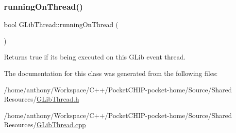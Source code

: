 \subsubsection{\texorpdfstring{running\+On\+Thread()}{runningOnThread()}}
{\footnotesize\ttfamily bool G\+Lib\+Thread\+::running\+On\+Thread (\begin{DoxyParamCaption}{ }\end{DoxyParamCaption})}

Returns true if it\textquotesingle{}s being executed on this G\+Lib event thread. 

The documentation for this class was generated from the following files\+:\begin{DoxyCompactItemize}
\item 
/home/anthony/\+Workspace/\+C++/\+Pocket\+C\+H\+I\+P-\/pocket-\/home/\+Source/\+Shared Resources/\mbox{\hyperlink{GLibThread_8h}{G\+Lib\+Thread.\+h}}\item 
/home/anthony/\+Workspace/\+C++/\+Pocket\+C\+H\+I\+P-\/pocket-\/home/\+Source/\+Shared Resources/\mbox{\hyperlink{GLibThread_8cpp}{G\+Lib\+Thread.\+cpp}}\end{DoxyCompactItemize}
